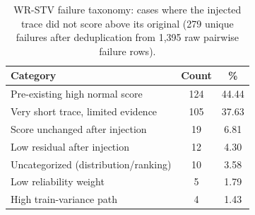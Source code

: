 \begin{table}[t]
\centering
\caption{WR-STV failure taxonomy: cases where the injected trace did not
score above its original (279 unique failures after deduplication from
1{,}395 raw pairwise failure rows).}
\label{tab:failure-categories}
\begin{tabular}{lcc}
\toprule
\textbf{Category} & \textbf{Count} & \textbf{\%} \\
\midrule
Pre-existing high normal score       & 124 & 44.44 \\
Very short trace, limited evidence   & 105 & 37.63 \\
Score unchanged after injection      & 19  & 6.81 \\
Low residual after injection         & 12  & 4.30 \\
Uncategorized (distribution/ranking) & 10  & 3.58 \\
Low reliability weight               & 5   & 1.79 \\
High train-variance path             & 4   & 1.43 \\
\bottomrule
\end{tabular}
\end{table}
